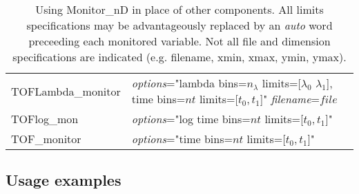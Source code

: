 \begin{table}
\begin{center}
{\begin{tabular}{|p{}|p{}|}
TOFLambda\_monitor  & {\it options}="lambda bins=$n_\lambda$ limits=[$\lambda_0$ $\lambda_1$], time bins=$nt$ limits=[$t_0, t_1$]" {\it filename}=$file$\\
TOFlog\_mon         & {\it options}="log time bins=$nt$ limits=[$t_0, t_1$]" \\
TOF\_monitor        & {\it options}="time bins=$nt$ limits=[$t_0, t_1$]" \\
\hline
    \end{tabular}
    \caption{Using Monitor\_nD in place of other components. All limits specifications may be advantageously replaced by an {\it auto} word preceeding each monitored variable. Not all file and dimension specifications are indicated (e.g. filename, xmin, xmax, ymin, ymax).}
    \label{t:monitor-nd-equiv}
    }
  \end{center}
\end{table}

\subsection{Usage examples}

